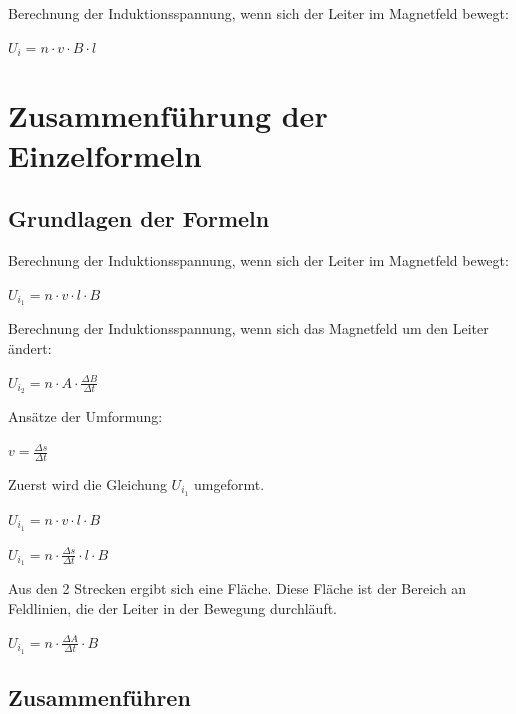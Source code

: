 \documentclass{article}
\begin{document}
\normalsize
Berechnung der Induktionsspannung, wenn sich der Leiter im Magnetfeld bewegt:
\newline

\Large
$U_{i} = n \cdot v \cdot B \cdot l$

\newpage

\section*{Zusammenführung der Einzelformeln}

\subsection*{Grundlagen der Formeln}

\normalsize
Berechnung der Induktionsspannung, wenn sich der Leiter im Magnetfeld bewegt:
\newline

\Large
$U_{i_1} = n \cdot v \cdot l \cdot B$
\newline

\normalsize
Berechnung der Induktionsspannung, wenn sich das Magnetfeld um den Leiter ändert:
\newline

\Large
$U_{i_2} = n \cdot A \cdot \frac{\Delta B}{\Delta t}$
\newline

\normalsize
Ansätze der Umformung:
\newline

\Large
$v = \frac{\Delta s}{\Delta t}$
\newline

\normalsize
Zuerst wird die Gleichung $U_{i_1}$ umgeformt.
\newline

\Large
$U_{i_1} = n \cdot v \cdot l \cdot B$

$U_{i_1} = n \cdot \frac{\Delta s}{\Delta t} \cdot l \cdot B$
\newline

\normalsize
Aus den 2 Strecken ergibt sich eine Fläche. Diese Fläche ist der Bereich an
Feldlinien, die der Leiter in der Bewegung durchläuft.
\newline

\Large
$U_{i_1} = n \cdot \frac{\Delta A}{\Delta t} \cdot B$

\newpage

\subsection*{Zusammenführen}
\end{document}
